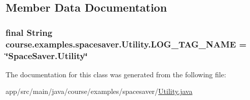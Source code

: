 \subsection{Member Data Documentation}
\hypertarget{classcourse_1_1examples_1_1spacesaver_1_1_utility_a306cf6f2267973d242405123fc51c775}{}
\subsubsection[{L\+O\+G\+\_\+\+T\+A\+G\+\_\+\+N\+A\+M\+E}]{\setlength{\rightskip}{0pt plus 5cm}final String course.\+examples.\+spacesaver.\+Utility.\+L\+O\+G\+\_\+\+T\+A\+G\+\_\+\+N\+A\+M\+E = \char`\"{}Space\+Saver.\+Utility\char`\"{}\hspace{0.3cm}{\ttfamily [static]}}\label{classcourse_1_1examples_1_1spacesaver_1_1_utility_a306cf6f2267973d242405123fc51c775}


The documentation for this class was generated from the following file\+:\begin{DoxyCompactItemize}
\item 
app/src/main/java/course/examples/spacesaver/\hyperlink{_utility_8java}{Utility.\+java}\end{DoxyCompactItemize}
